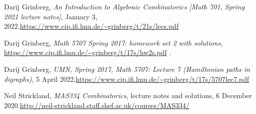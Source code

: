 \documentclass[numbers=enddot,12pt,final,onecolumn,notitlepage]{scrartcl}%
\numberwithin{exer}{subsection}
\theoremstyle{definition}
\begin{document}
\begin{thebibliography}{99999999}
Darij Grinberg, \textit{An Introduction to Algebraic
Combinatorics [Math 701, Spring 2021 lecture notes]}, January 3, 2022.\newline\url{https://www.cip.ifi.lmu.de/~grinberg/t/21s/lecs.pdf}

Darij Grinberg, \textit{Math 5707 Spring 2017: homework
set 2 with solutions},
\url{https://www.cip.ifi.lmu.de/~grinberg/t/17s/hw2s.pdf} .

Darij Grinberg, \textit{UMN, Spring 2017, Math 5707:
Lecture 7 (Hamiltonian paths in digraphs)}, 5 April 2022.\newline\url{https://www.cip.ifi.lmu.de/~grinberg/t/17s/5707lec7.pdf}

Neil Strickland, \textit{MAS334 Combinatorics},
lecture notes and solutions, 6 December 2020.\newline\url{http://neil-strickland.staff.shef.ac.uk/courses/MAS334/}
\end{thebibliography}
\end{document}
